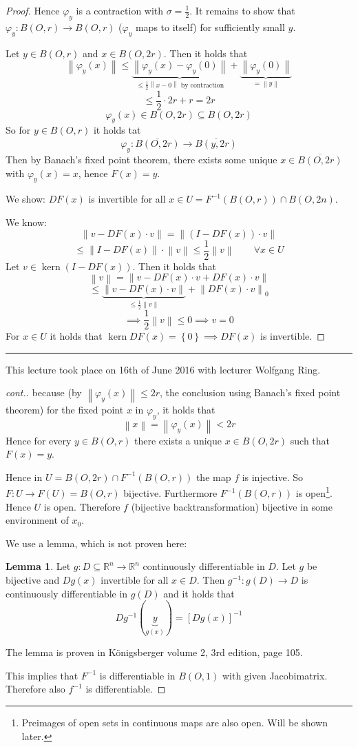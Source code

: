 \documentclass[a4paper,landscape,twocolumn]{article}
\theoremstyle{definition}
\newtheorem{lemma}{Lemma}
\DeclareMathOperator{\kernel}{kern}
\newcommand\set[1]{\left\{#1\right\}}
\newcommand\meta[3]{\hrule{} This #1 took place on #2 with lecturer #3.\par}
\newcommand\norm[1]{\left\|#1\right\|}
\begin{document}
\begin{proof}
  Hence $\varphi_y$ is a contraction with $\sigma = \frac12$.
  It remains to show that $\varphi_y: B(O,r) \to B(O,r)$ ($\varphi_y$ maps to itself) for sufficiently small $y$.

  Let $y \in B(O,r)$ and $x \in B(O, 2r)$. Then it holds that
  \[ \norm{\varphi_y(x)} \leq \underbrace{\norm{\varphi_y(x) - \varphi_y(0)}}_{\leq \frac12 \norm{x - 0} \text{ by contraction}} + \underbrace{\norm{\varphi_y(0)}}_{=\norm{y}} \]
  \[ \leq \frac12 \cdot 2r + r = 2r \]
  \[ \varphi_y(x) \in B(O, 2r) \subseteq B(O,2r) \]
  So for $y \in B(O,r)$ it holds tat
  \[ \varphi_y: \overline{B(O,2r)} \to \overline{B(y,2r)} \]
  Then by Banach's fixed point theorem, there exists some unique
  $x \in \overline{B(O,2r)}$ with $\varphi_y(x) = x$, hence $F(x) = y$.

  We show: $DF(x)$ is invertible for all $x \in U = F^{-1}(B(O,r)) \cap B(O,2n)$.

  We know:
  \[ \norm{v - DF(x) \cdot v} = \norm{(I - DF(x)) \cdot v} \]
  \[ \leq \norm{I - DF(x)} \cdot \norm{v} \leq \frac12 \norm{v}
  \qquad \forall x \in U \]
  Let $v \in \kernel{(I - DF(x))}$.
  Then it holds that
  \[ \norm{v} = \norm{v - DF(x) \cdot v + DF(x) \cdot v} \]
  \[ \leq \underbrace{\norm{v - DF(x) \cdot v}}_{\leq \frac12 \norm{v}} + \norm{DF(x) \cdot v}_{0} \]
  \[ \implies \frac12 \norm{v} \leq 0 \implies v = 0 \]
  For $x \in U$ it holds that $\kernel{DF(x)} = \set{0} \implies DF(x)$ is invertible.
\end{proof}


\meta{lecture}{16th of June 2016}{Wolfgang Ring}

\begin{proof}[cont.]
  because (by $\norm{\varphi_y(x)} \leq 2r$, the conclusion using Banach's fixed point theorem)
  for the fixed point $x$ in $\varphi_y$, it holds that
  \[ \norm{x} = \norm{\varphi_y(x)} < 2r \]
  Hence for every $y \in B(O,r)$ there exists a unique $x \in B(O,2r)$ such that $F(x) = y$.

  Hence in $U = B(O,2r) \cap F^{-1}(B(O,r))$ the map $f$ is injective. So $F: U \to F(U) = B(O,r)$
  bijective. Furthermore $F^{-1}(B(O,r))$ is open\footnote{Preimages of open sets in continuous
  maps are also open. Will be shown later.}.
  Hence $U$ is open. Therefore $f$ (bijective backtransformation) bijective in some environment
  of $x_0$.

  We use a lemma, which is not proven here:
  \begin{lemma}
    Let $g: D \subseteq \mathbb R^n \to \mathbb R^n$ continuously differentiable in $D$.
    Let $g$ be bijective and $Dg(x)$ invertible for all $x \in D$.
    Then $g^{-1}: g(D) \to D$ is continuously differentiable in $g(D)$ and it holds that
    \[ Dg^{-1}(\underbrace{y}_{g(x)}) = \left[Dg(x)\right]^{-1} \]
  \end{lemma}
  The lemma is proven in Königsberger volume 2, 3rd edition, page 105.

  This implies that $F^{-1}$ is differentiable in $B(O,1)$ with given Jacobimatrix.
  Therefore also $f^{-1}$ is differentiable.
\end{proof}
\end{document}
